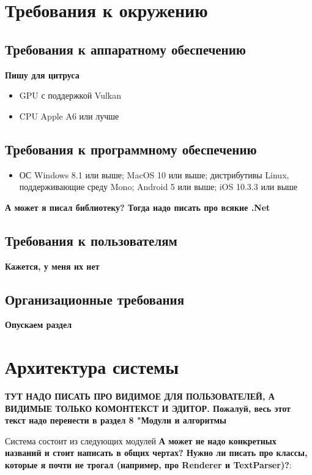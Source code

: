 \documentclass{fefu}
\begin{document}
	\section{Требования к окружению}
		\subsection{Требования к аппаратному обеспечению}
			\textbf{Пишу для цитруса}
			\begin{itemize}
				\item GPU с поддержкой Vulkan
				\item CPU Apple A6  или лучше
			\end{itemize}
		\subsection{Требования к программному обеспечению}
			\begin{itemize}
				\item ОС Windows 8.1 или выше; MacOS 10 или выше; дистрибутивы 
				Linux, поддерживающие среду Mono; Android 5 или выше; iOS 10.3.3 или выше
			\end{itemize}
			\textbf{А может я писал библиотеку? Тогда надо писать про всякие .Net}
		\subsection{Требования к пользователям}
			\textbf{Кажется, у меня их нет}
		\subsection{Организационные требования}
			\textbf{Опускаем раздел}
	\section{Архитектура системы}
		\par \textbf{ТУТ НАДО ПИСАТЬ ПРО ВИДИМОЕ ДЛЯ ПОЛЬЗОВАТЕЛЕЙ, А ВИДИМЫЕ ТОЛЬКО 
		КОМОНТЕКСТ И ЭДИТОР. Пожалуй, весь этот текст надо перенести в раздел 8 "Модули и
		алгоритмы}
		\par Система состоит из следующих модулей \textbf{А может не надо конкретных названий
		и стоит написать в общих чертах? Нужно ли писать про классы, которые я почти не 
		трогал (например, про Renderer и TextParser)?}:
		
\end{document}
